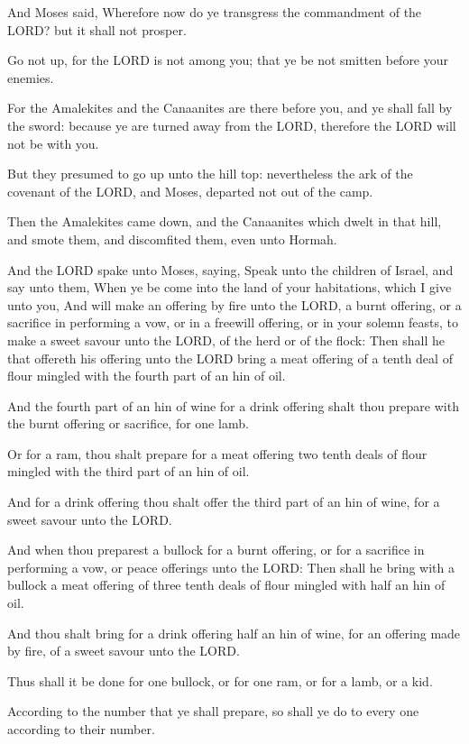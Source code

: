 \Verse And Moses said, Wherefore now do ye transgress the commandment
of the LORD? but it shall not prosper.

\Verse Go not up, for the LORD is not among you; that ye be not smitten
before your enemies.

\Verse For the Amalekites and the Canaanites are there before you, and
ye shall fall by the sword: because ye are turned away from the LORD,
therefore the LORD will not be with you.

\Verse But they presumed to go up unto the hill top: nevertheless the
ark of the covenant of the LORD, and Moses, departed not out of the
camp.

\Verse Then the Amalekites came down, and the Canaanites which dwelt in
that hill, and smote them, and discomfited them, even unto Hormah.


\Chapter
\Verse And the LORD spake unto Moses, saying, \Verse Speak unto the
children of Israel, and say unto them, When ye be come into the land
of your habitations, which I give unto you, \Verse And will make an
offering by fire unto the LORD, a burnt offering, or a sacrifice in
performing a vow, or in a freewill offering, or in your solemn feasts,
to make a sweet savour unto the LORD, of the herd or of the flock:
\Verse Then shall he that offereth his offering unto the LORD bring a
meat offering of a tenth deal of flour mingled with the fourth part of
an hin of oil.

\Verse And the fourth part of an hin of wine for a drink offering shalt
thou prepare with the burnt offering or sacrifice, for one lamb.

\Verse Or for a ram, thou shalt prepare for a meat offering two tenth
deals of flour mingled with the third part of an hin of oil.

\Verse And for a drink offering thou shalt offer the third part of an
hin of wine, for a sweet savour unto the LORD.

\Verse And when thou preparest a bullock for a burnt offering, or for a
sacrifice in performing a vow, or peace offerings unto the LORD: \Verse
Then shall he bring with a bullock a meat offering of three tenth
deals of flour mingled with half an hin of oil.

\Verse And thou shalt bring for a drink offering half an hin of wine,
for an offering made by fire, of a sweet savour unto the LORD.

\Verse Thus shall it be done for one bullock, or for one ram, or for a
lamb, or a kid.

\Verse According to the number that ye shall prepare, so shall ye do to
every one according to their number.

